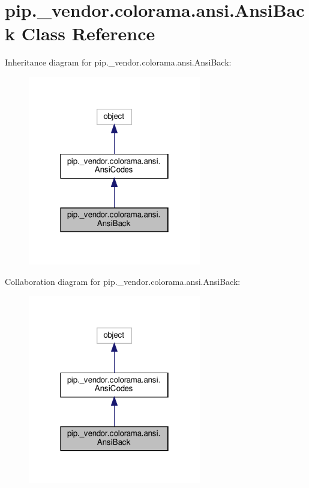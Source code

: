 \hypertarget{classpip_1_1__vendor_1_1colorama_1_1ansi_1_1AnsiBack}{}\section{pip.\+\_\+vendor.\+colorama.\+ansi.\+Ansi\+Back Class Reference}
\label{classpip_1_1__vendor_1_1colorama_1_1ansi_1_1AnsiBack}


Inheritance diagram for pip.\+\_\+vendor.\+colorama.\+ansi.\+Ansi\+Back\+:
\nopagebreak
\begin{figure}[H]
\begin{center}
\leavevmode
\includegraphics[width=214pt]{classpip_1_1__vendor_1_1colorama_1_1ansi_1_1AnsiBack__inherit__graph}
\end{center}
\end{figure}


Collaboration diagram for pip.\+\_\+vendor.\+colorama.\+ansi.\+Ansi\+Back\+:
\nopagebreak
\begin{figure}[H]
\begin{center}
\leavevmode
\includegraphics[width=214pt]{classpip_1_1__vendor_1_1colorama_1_1ansi_1_1AnsiBack__coll__graph}
\end{center}
\end{figure}
